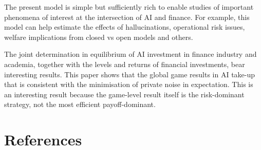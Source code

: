 \documentclass[
]{article}
\theoremstyle{plain}
\theoremstyle{definition}
\theoremstyle{remark}
\begin{document}
The present model is simple but sufficiently rich to enable studies of
important phenomena of interest at the intersection of AI and finance.
For example, this model can help estimate the effects of hallucinations,
operational risk issues, welfare implications from closed vs open models
and others.

The joint determination in equilibrium of AI investment in finance
industry and academia, together with the levels and returns of financial
investments, bear interesting results. This paper shows that the global
game results in AI take-up that is consistent with the minimisation of
private noise in expectation. This is an interesting result because the
game-level result itself is the risk-dominant strategy, not the most
efficient payoff-dominant.

\section*{References}\label{references}
\end{document}
